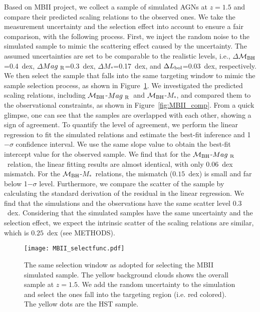 \documentclass{natureprintstyle}
\newcommand{\mbh}{$\mathcal M_{\rm BH}$}
\newcommand{\mr}{$Mag_{\rm ~R}$}
\newcommand{\mstar}{{$M_*$}}
\begin{document}
Based on MBII project, we collect a sample of simulated AGNs at $z=1.5$ and compare their predicted scaling relations to the observed ones. We take the measurement uncertainty and the selection effect into account to ensure a fair comparison,  with the following process. First, we inject the random noise to the simulated sample to mimic the scattering effect caused by the uncertainty. The assumed uncertainties are set to be comparable to the realistic levels, i.e., $\Delta$\mbh =0.4~dex, $\Delta$\mr=0.3~dex, $\Delta$\mstar=0.17~dex, and $\Delta L_{\rm bol}$=0.03~dex, respectively. We then select the sample that falls into the same targeting window to mimic the sample selection process, as shown in Figure~\ref{fig:selectfunc}. We investigated the predicted scaling relations, including \mbh-\mr\ and \mbh-\mstar, and compared them to the observational constraints, as shown in Figure~\ref{fig:MBII_comp}. From a quick glimpse, one can see that the samples are overlapped with each other, showing a sign of agreement. To quantify the level of agreement, we perform the linear regression to fit the simulated relations and estimate the best-fit inference and 1$-\sigma$ confidence interval. We use the same slope value to obtain the best-fit intercept value for the observed sample. We find that for the \mbh-\mr\ relation, the linear fitting results are almost identical, with only $0.06$~dex mismatch. For the \mbh-\mstar\ relations, the mismatch ($0.15$~dex) is small and far below 1$-\sigma$ level. Furthermore, we compare the scatter of the sample by calculating the standard derivation of the residual in the linear regression. We find that the simulations and the observations have the same scatter level $0.3$~dex. Considering that the simulated samples have the same uncertainty and the selection effect, we expect the intrinsic scatter of the scaling relations are similar, which is $0.25$~dex (see METHODS).

\begin{figure}[t]
\texttt{[image: MBII\_selectfunc.pdf]}
\caption{The same selection window as adopted for selecting the MBII simulated sample. The yellow background clouds shows the overall sample at $z=1.5$. We add the random uncertainty to the simulation and select the ones fall into the targeting region (i.e. red colored). The yellow dots are the HST sample.}
\label{fig:selectfunc}
\end{figure}
\end{document}
